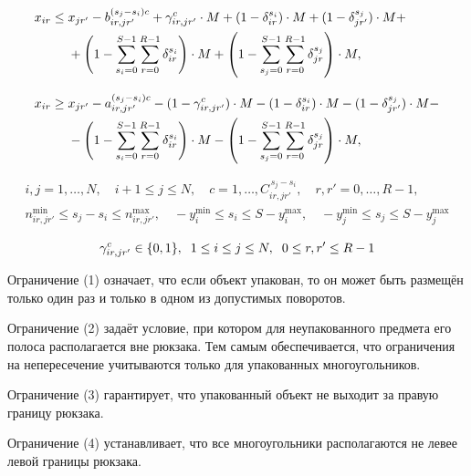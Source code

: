 \documentclass[a4paper]{article}
\begin{document}
    \begin{align}
    x_{ir} \leq\;& x_{jr'} - b_{ir,jr'}^{(s_j - s_i)c} + \gamma_{ir,jr'}^c \cdot M 
    + (1 - \delta_{ir}^{s_i}) \cdot M + (1 - \delta_{jr'}^{s_j}) \cdot M + \notag \\
    &+ \left(1 - \sum_{s_i=0}^{S-1} \sum_{r=0}^{R-1} \delta_{ir}^{s_i}\right) \cdot M 
    + \left(1 - \sum_{s_j=0}^{S-1} \sum_{r=0}^{R-1} \delta_{jr}^{s_j}\right) \cdot M,
    \label{eq:nonoverlap1}
    \\[0.3cm]
    x_{ir} \geq\;& x_{jr'} - a_{ir,jr'}^{(s_j - s_i)c} - (1 - \gamma_{ir,jr'}^c) \cdot M 
    - (1 - \delta_{ir}^{s_i}) \cdot M - (1 - \delta_{jr'}^{s_j}) \cdot M \notag - \\
    &- \left(1 - \sum_{s_i=0}^{S-1} \sum_{r=0}^{R-1} \delta_{ir}^{s_i}\right) \cdot M 
    - \left(1 - \sum_{s_j=0}^{S - 1} \sum_{r=0}^{R - 1} \delta_{jr}^{s_j}\right) \cdot M,
    \label{eq:nonoverlap2}
    \end{align}

    \[
    \begin{gathered}
    i,j = 1,\ldots,N, \quad i + 1 \leq j \leq N, \quad
    c = 1, \ldots,C_{ir,jr'}^{\,s_j-s_i}, \quad r,r' = 0,\ldots,R-1, \\
    n_{ir,jr'}^{\min} \leq s_j-s_i \leq n_{ir,jr'}^{\max}, \quad
    -y_i^{\min} \leq s_i \leq S - y_i^{\max}, \quad
    -y_j^{\min} \leq s_j \leq S - y_j^{\max}
    \end{gathered}
    \label{eq:nonoverlap_index}
    \]
    
    \begin{equation}
    \gamma_{ir,jr'}^c \in \{0,1\}, \hspace{0.2cm} 1 \leq i \leq j \leq N, \hspace{0.2cm} 0 \leq r, r' \leq R - 1 
    \end{equation}

    Ограничение (1) означает, что если объект упакован, то он может быть размещён только один раз и только в одном из допустимых поворотов. 
    
    Ограничение (2) задаёт условие, при котором для неупакованного предмета его полоса располагается вне рюкзака. Тем самым обеспечивается, что ограничения на непересечение учитываются только для упакованных многоугольников.
        
    Ограничение (3) гарантирует, что упакованный объект не выходит за правую границу рюкзака.
    
    Ограничение (4) устанавливает, что все многоугольники располагаются не левее левой границы рюкзака.
    
\end{document}
